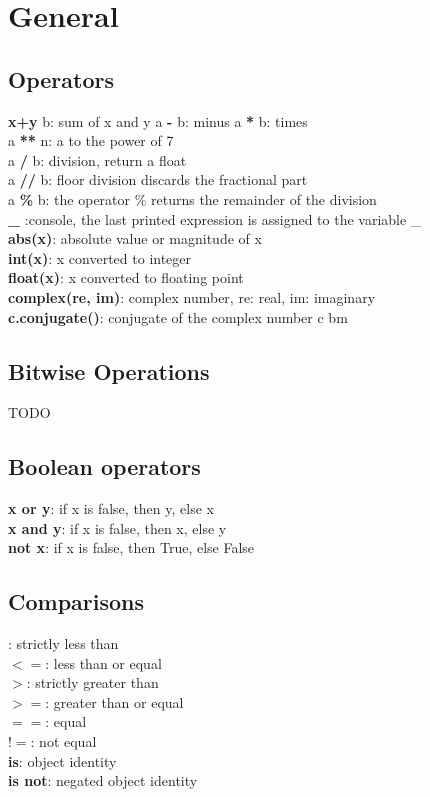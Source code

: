 \documentclass{cheatsheet}
\author{Leonardo Saurwein - lsaurwein@student.ethz.ch}
\begin{document}
\section{General}
    \subsection{Operators}
    \textbf{x+y} b: sum of x and y \hspace{1cm} a \textbf{-} b: minus \hspace{1cm} a \textbf{*} b: times \\
    a \textbf{**} n: a to the power of 7 \\
    a \textbf{/} b: division, return a float \\
    a \textbf{//} b: floor division discards the fractional part \\
    a \textbf{\%} b: the operator \% returns the remainder of the division \\
    \textbf{\_} :console, the last printed expression is assigned to the variable \_ \\
    \textbf{abs(x)}: absolute value or magnitude of x \\
    \textbf{int(x)}: x converted to integer \\
    \textbf{float(x)}: x converted to floating point \\
    \textbf{complex(re, im)}: complex number, re: real, im: imaginary \\
    \textbf{c.conjugate()}: conjugate of the complex number c
    bm
    \subsection{Bitwise Operations}
    TODO

    \subsection{Boolean operators}
    \textbf{x or y}: if x is false, then y, else x \\
    \textbf{x and y}: if x is false, then x, else y \\
    \textbf{not x}: if x is false, then True, else False \\
    \subsection{Comparisons}
    \boldsymbol{$<$}: strictly less than \\
    \textbf{$<=$}: less than or equal \\
    \textbf{$>$}: strictly greater than \\
    \textbf{$>=$}: greater than or equal \\
    \textbf{$==$}: equal \\
    \textbf{$!=$}: not equal \\
    \textbf{is}: object identity \\
    \textbf{is not}: negated object identity
\end{document}
